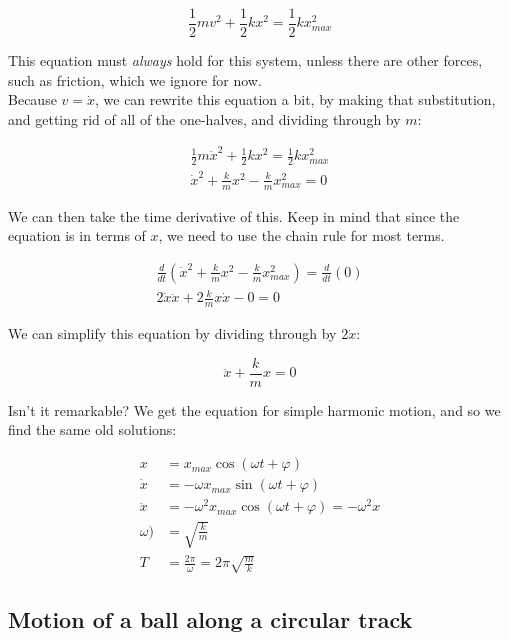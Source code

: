 \documentclass[8.01x]{subfiles}
\begin{document}
\begin{equation}
\frac{1}{2} m v^2 + \frac{1}{2} k x^2 = \frac{1}{2} k x_{max}^2
\end{equation}

This equation must \emph{always} hold for this system, unless there are other forces, such as friction, which we ignore for now.\\
Because $v = \dot{x}$, we can rewrite this equation a bit, by making that substitution, and getting rid of all of the one-halves, and dividing through by $m$:

\begin{align}
\frac{1}{2} m \dot{x}^2 + \frac{1}{2} k x^2 = \frac{1}{2} k x_{max}^2\\
\dot{x}^2 + \frac{k}{m} x^2 - \frac{k}{m} x_{max}^2 = 0
\end{align}

We can then take the time derivative of this. Keep in mind that since the equation is in terms of $x$, we need to use the chain rule for most terms.

\begin{align}
\frac{d}{dt} \left(\dot{x}^2 + \frac{k}{m} x^2 - \frac{k}{m} x_{max}^2\right) = \frac{d}{dt} (0)\\
2 \dot{x} \ddot{x} + 2 \frac{k}{m} x \dot{x} - 0 = 0
\end{align}

We can simplify this equation by dividing through by $2 \dot{x}$:

\begin{equation}
\ddot{x} + \frac{k}{m} x = 0
\end{equation}

Isn't it remarkable? We get the equation for simple harmonic motion, and so we find the same old solutions:

\begin{align}
x        &= x_{max} \cos(\omega t + \varphi)\\
\dot{x}  &= - \omega x_{max} \sin(\omega t + \varphi)\\
\ddot{x} &= - \omega^2 x_{max} \cos(\omega t + \varphi) = -\omega^2 x\\
\omega  )    &= \sqrt{\frac{k}{m}}\\
T           &= \frac{2 \pi}{\omega} = 2 \pi \sqrt{\frac{m}{k}}
\end{align}

\subsection{Motion of a ball along a circular track}
\end{document}

